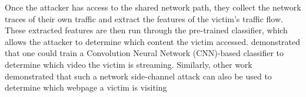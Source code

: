 Once the attacker has access to the shared network path, they collect the network traces of their own traffic and extract the features of the victim's traffic flow.
These extracted features are then run through the pre-trained classifier, which allows the attacker to determine which content the victim accessed. 
\citet{schuster2017beautyburst} demonstrated that one could train a Convolution Neural Network (CNN)-based classifier to determine which video the victim is streaming.
Similarly, other work demonstrated that such a network side-channel attack can also be used to determine which webpage a victim is visiting \cite{hayes2016kfp, panchenko2016website, gong2010fingerprinting}


